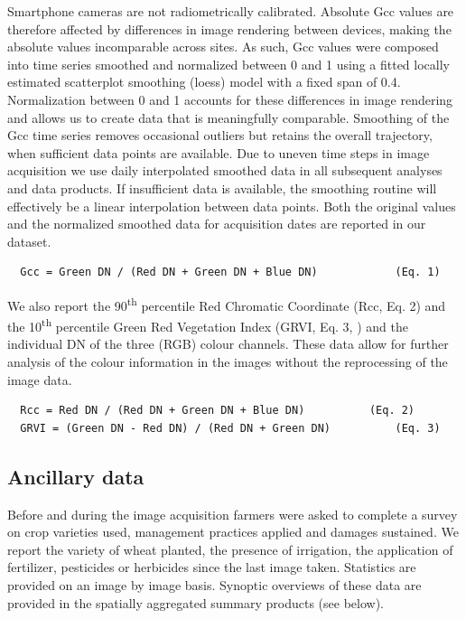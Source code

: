 \documentclass[, manuscript]{copernicus}
\begin{document}
Smartphone cameras are not radiometrically calibrated. Absolute Gcc
values are therefore affected by differences in image rendering between
devices, making the absolute values incomparable across sites. As such,
Gcc values were composed into time series smoothed and normalized
between 0 and 1 using a fitted locally estimated scatterplot smoothing
(loess) model with a fixed span of 0.4. Normalization between 0 and 1
accounts for these differences in image rendering and allows us to
create data that is meaningfully comparable. Smoothing of the Gcc time
series removes occasional outliers but retains the overall trajectory,
when sufficient data points are available. Due to uneven time steps in
image acquisition we use daily interpolated smoothed data in all
subsequent analyses and data products. If insufficient data is
available, the smoothing routine will effectively be a linear
interpolation between data points. Both the original values and the
normalized smoothed data for acquisition dates are reported in our
dataset.

\begin{verbatim}
  Gcc = Green DN / (Red DN + Green DN + Blue DN)            (Eq. 1)
\end{verbatim}

We also report the 90\textsuperscript{th} percentile Red Chromatic
Coordinate (Rcc, Eq. 2) and the 10\textsuperscript{th} percentile Green
Red Vegetation Index (GRVI, Eq. 3, \citet{motohka2010}) and the
individual DN of the three (RGB) colour channels. These data allow for
further analysis of the colour information in the images without the
reprocessing of the image data.

\begin{verbatim}
  Rcc = Red DN / (Red DN + Green DN + Blue DN)          (Eq. 2)
  GRVI = (Green DN - Red DN) / (Red DN + Green DN)          (Eq. 3)
\end{verbatim}

\subsection{Ancillary data}

Before and during the image acquisition farmers were asked to complete a
survey on crop varieties used, management practices applied and damages
sustained. We report the variety of wheat planted, the presence of
irrigation, the application of fertilizer, pesticides or herbicides
since the last image taken. Statistics are provided on an image by image
basis. Synoptic overviews of these data are provided in the spatially
aggregated summary products (see below).
\end{document}
